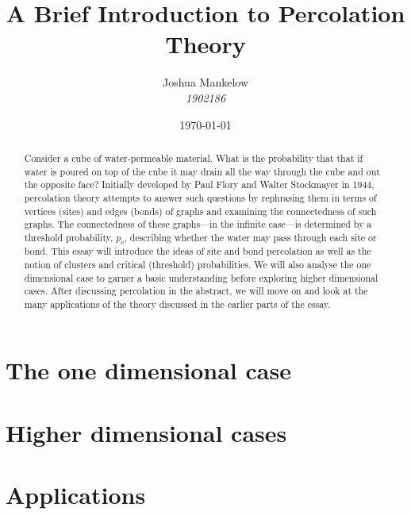 \documentclass[a4paper,11pt]{article}
\title{\textbf{ A Brief Introduction to Percolation Theory }}
\author{Joshua Mankelow \\ \textit{1902186}}
\date{\today}
\theoremstyle{plain} %
\theoremstyle{definition} %
\theoremstyle{remark} %
\begin{document}
  
\maketitle


\begin{abstract}
  Consider a cube of water-permeable material. What is the probability that that if water is poured on top of the cube it may drain all the way through
  the cube and out the opposite face? 
  Initially developed by Paul Flory and Walter Stockmayer in 1944, percolation theory attempts to answer such questions by rephrasing them
  in terms of vertices (sites) and edges (bonds) of graphs and examining the connectedness of such graphs. The connectedness of these graphs---in the infinite case---is
  determined by a threshold probability, $p_c$, describing whether the water may pass through each site or bond.
  This essay will introduce the ideas of site and bond percolation as well as the notion of clusters and critical (threshold) probabilities.
  We will also analyse the one dimensional case to garner a basic understanding before exploring higher dimensional cases. After discussing percolation in the abstract, we will move on and look at the many applications of the
  theory discussed in the earlier parts of the essay. 
\end{abstract}

\newpage

\tableofcontents

\newpage



\section{The one dimensional case}

\section{Higher dimensional cases}

\section{Applications}
\end{document}
